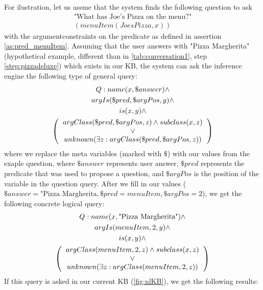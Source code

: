 For ilustration, let us assme that the system finds the following question to
ask 
\begin{equation*}
\begin{gathered}
\text{"What has Joe's Pizza on the menu?"}\\
(menuItem(JoesPizza,x))
\end{gathered}
\end{equation*}
with the argumentconstraints on the predicate as defined in assertion 
\ref{as:pred_menuItem}. Assuming that the user answers with "Pizza Margherita"
(hypothetical example, different than in \autoref{tab:conversation1}, step
\ref{step:pizzadeluxe}) which exists in our KB, the system can ask the inference
engine the following type of general query:
\begin{equation}\label{q:generalConstraint}
\begin{gathered}
    Q:name(x,\$answer)\land \\ %
    argIs(\$pred,\$argPos,y)\land \\ %
    is(x,y)\land \\
    \left(
    \begin{tabular}{c}
        $argClass(\$pred,\$argPos,z) \land  subclass(x,z)$\\
        $\lor$\\
        $unknown(\exists z:argClass(\$pred,\$argPos,z))$ \\
    \end{tabular}
    \right)
\end{gathered}
\end{equation}
where we replace the meta variables (marked with $\$$) with our values from 
the exaple question, where $\$answer$ represents user answer, $\$pred$ 
represents the predicate that was used to propose a question, and 
$\$argPos$ is the position of the variable in the question query. After we
fill in our values ($\$answer=\text{"Pizza Margherita}, \$pred=menuItem, 
\$argPos=2$), we get the following concrete logical query:
\begin{equation}\label{q:constraintQuery}
\begin{gathered}
   Q:name(x,\text{"Pizza Margherita"})\land \\ 
    argIs(menuItem,2,y)\land \\
    is(x,y)\land \\
    \left(
    \begin{tabular}{c}
        $argClass(menuItem,2,z) \land  subclass(x,z)$\\
        $\lor$\\
        $unknown(\exists z: argClass(menuItem,2,z))$ \\
    \end{tabular}
    \right)
\end{gathered}
\end{equation}
If this query is asked in our current KB (\autoref{fig:nlKB}), we get the 
following results:

